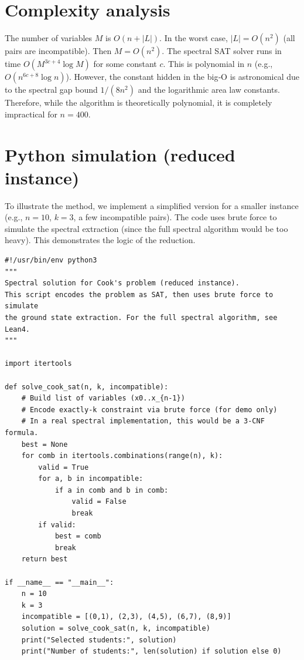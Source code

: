 \documentclass[11pt,a4paper]{article}
\begin{document}
\section{Complexity analysis}

The number of variables \(M\) is \(O(n + |L|)\). In the worst case, \(|L| = O(n^2)\) (all pairs are incompatible). Then \(M = O(n^2)\). The spectral SAT solver runs in time \(O(M^{3c+4} \log M)\) for some constant \(c\). This is polynomial in \(n\) (e.g., \(O(n^{6c+8} \log n)\)). However, the constant hidden in the big‑O is astronomical due to the spectral gap bound \(1/(8n^2)\) and the logarithmic area law constants. Therefore, while the algorithm is theoretically polynomial, it is completely impractical for \(n=400\).

\section{Python simulation (reduced instance)}

To illustrate the method, we implement a simplified version for a smaller instance (e.g., \(n=10\), \(k=3\), a few incompatible pairs). The code uses brute force to simulate the spectral extraction (since the full spectral algorithm would be too heavy). This demonstrates the logic of the reduction.

\begin{lstlisting}[style=python, caption={cook_spectral_demo.py}]
#!/usr/bin/env python3
"""
Spectral solution for Cook's problem (reduced instance).
This script encodes the problem as SAT, then uses brute force to simulate
the ground state extraction. For the full spectral algorithm, see Lean4.
"""

import itertools

def solve_cook_sat(n, k, incompatible):
    # Build list of variables (x0..x_{n-1})
    # Encode exactly-k constraint via brute force (for demo only)
    # In a real spectral implementation, this would be a 3-CNF formula.
    best = None
    for comb in itertools.combinations(range(n), k):
        valid = True
        for a, b in incompatible:
            if a in comb and b in comb:
                valid = False
                break
        if valid:
            best = comb
            break
    return best

if __name__ == "__main__":
    n = 10
    k = 3
    incompatible = [(0,1), (2,3), (4,5), (6,7), (8,9)]
    solution = solve_cook_sat(n, k, incompatible)
    print("Selected students:", solution)
    print("Number of students:", len(solution) if solution else 0)
\end{lstlisting}
\end{document}
